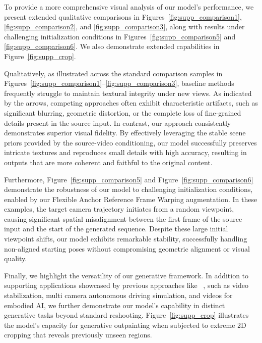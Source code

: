 To provide a more comprehensive visual analysis of our model's performance, we present extended qualitative comparisons in Figures~\ref{fig:supp_comparison1}, \ref{fig:supp_comparison2}, and \ref{fig:supp_comparison3}, along with results under challenging initialization conditions in Figures~\ref{fig:supp_comparison5} and \ref{fig:supp_comparison6}. We also demonstrate extended capabilities in Figure~\ref{fig:supp_crop}.

Qualitatively, as illustrated across the standard comparison samples in Figures~\ref{fig:supp_comparison1}--\ref{fig:supp_comparison3}, baseline methods frequently struggle to maintain textural integrity under new views. As indicated by the arrows, competing approaches often exhibit characteristic artifacts, such as significant blurring, geometric distortion, or the complete loss of fine-grained details present in the source input. In contrast, our approach consistently demonstrates superior visual fidelity. By effectively leveraging the stable scene priors provided by the source-video conditioning, our model successfully preserves intricate textures and reproduces small details with high accuracy, resulting in outputs that are more coherent and faithful to the original content.

Furthermore, Figure~\ref{fig:supp_comparison5} and Figure~\ref{fig:supp_comparison6} demonstrate the robustness of our model to challenging initialization conditions, enabled by our Flexible Anchor Reference Frame Warping augmentation. In these examples, the target camera trajectory initiates from a random viewpoint, causing significant spatial misalignment between the first frame of the source input and the start of the generated sequence. Despite these large initial viewpoint shifts, our model exhibits remarkable stability, successfully handling non-aligned starting poses without compromising geometric alignment or visual quality.

Finally, we highlight the versatility of our generative framework. In addition to supporting applications showcased by previous approaches like \recammaster{}~\cite{bai2025recammaster}, such as video stabilization, multi camera autonomous driving simulation, and videos for embodied AI, we further demonstrate our model's capability in distinct generative tasks beyond standard reshooting. Figure~\ref{fig:supp_crop} illustrates the model's capacity for generative outpainting when subjected to extreme 2D cropping that reveals previously unseen regions. 

